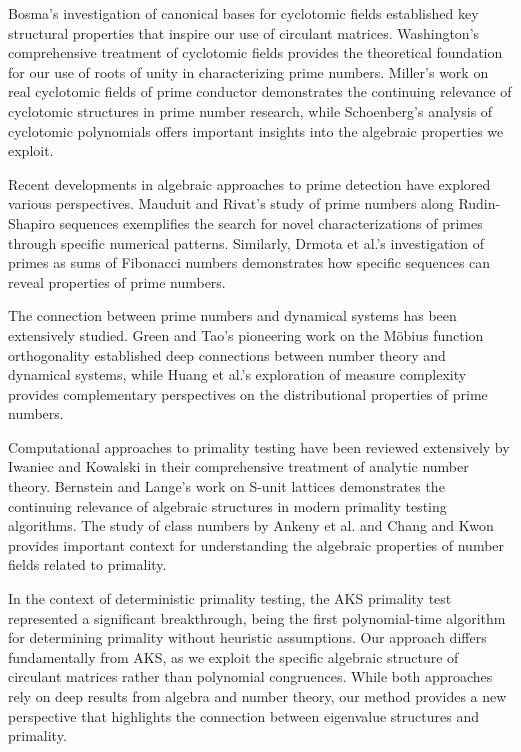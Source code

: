 Bosma's investigation of canonical bases for cyclotomic fields \cite{bosma1990canonical} established key structural properties that inspire our use of circulant matrices. Washington's comprehensive treatment of cyclotomic fields \cite{washington2012introduction} provides the theoretical foundation for our use of roots of unity in characterizing prime numbers. Miller's work on real cyclotomic fields of prime conductor \cite{miller2015real} demonstrates the continuing relevance of cyclotomic structures in prime number research, while Schoenberg's analysis of cyclotomic polynomials \cite{schoenberg1964note} offers important insights into the algebraic properties we exploit.

Recent developments in algebraic approaches to prime detection have explored various perspectives. Mauduit and Rivat's study of prime numbers along Rudin-Shapiro sequences \cite{mauduit2015prime} exemplifies the search for novel characterizations of primes through specific numerical patterns. Similarly, Drmota et al.'s investigation of primes as sums of Fibonacci numbers \cite{drmota2010primes} demonstrates how specific sequences can reveal properties of prime numbers.

The connection between prime numbers and dynamical systems has been extensively studied. Green and Tao's pioneering work on the Möbius function orthogonality \cite{green2012mobius} established deep connections between number theory and dynamical systems, while Huang et al.'s exploration of measure complexity \cite{huang2019measure} provides complementary perspectives on the distributional properties of prime numbers.

Computational approaches to primality testing have been reviewed extensively by Iwaniec and Kowalski \cite{iwaniec2004analytic} in their comprehensive treatment of analytic number theory. Bernstein and Lange's work on S-unit lattices \cite{bernstein2020s} demonstrates the continuing relevance of algebraic structures in modern primality testing algorithms. The study of class numbers by Ankeny et al. \cite{ankeny1956note} and Chang and Kwon \cite{chang2000class} provides important context for understanding the algebraic properties of number fields related to primality.

In the context of deterministic primality testing, the AKS primality test \cite{agrawal2004primes} represented a significant breakthrough, being the first polynomial-time algorithm for determining primality without heuristic assumptions. Our approach differs fundamentally from AKS, as we exploit the specific algebraic structure of circulant matrices rather than polynomial congruences. While both approaches rely on deep results from algebra and number theory, our method provides a new perspective that highlights the connection between eigenvalue structures and primality.

